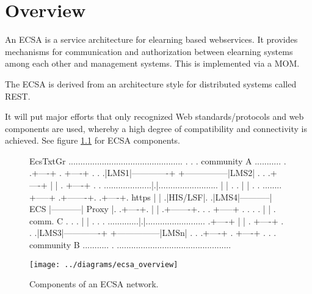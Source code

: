 \chapter{Overview}

An ECSA
is a service architecture for elearning based webservices. It provides
mechanisms for communication and authorization between elearning systems among
each other and management systems. This is implemented via a
MOM.

The ECSA is derived from an architecture style for distributed systems
called REST. 

It will put major efforts that only recognized Web standards/protocols
and web components are used, whereby a high degree of compatibility
and connectivity is achieved. See figure \ref{fig:ecsa_components}
for ECSA components.

\begin{figure}[p]
\noindent \begin{centering}
\begin{SaveVerbatim}{EcsTxtGr}
................................................
.                                              .
.            community A           ........... .
.+----+                            .  +----+ . .
.|LMS1|-------------+ +---------------|LMS2| . .
.+----+             | |            .  +----+ . .
....................|.|.........................
                    | |            .         . 
                    | |            .         . 
........          +-----+          .+-------+. 
.+----+.  https   |     |          .|HIS/LSF|. 
.|LMS4|-----------| ECS |-----------| Proxy |. 
.+----+.          |     |          .+-------+. 
.      .          +-----+          .         . 
.      .            | |            . comm. C . 
.      .            | |            .         . 
.      .............|.|.........................
.+----+             | |            .  +----+ . .
.|LMS3|-------------+ +---------------|LMSn| . .
.+----+                            .  +----+ . .
.            community B           ........... .
................................................

\end{SaveVerbatim}
%
  {}%
  {\texttt{[image: ../diagrams/ecsa\_overview]}}
\par\end{centering}
\caption[ECSA components.]{\label{fig:ecsa_components}Components of an ECSA network.}
\end{figure}

